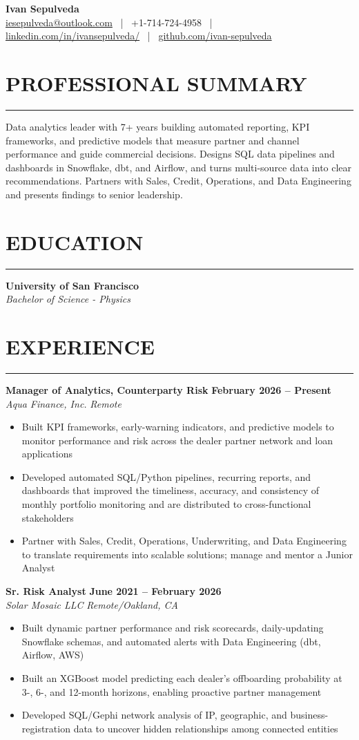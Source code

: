 \documentclass[10.5pt,letterpaper]{article}
\newcommand{\ressection}[1]{%
	\vspace{1.5mm}
	\section*{#1}
	\vspace{0.5mm}
	\hrule
	\vspace{1mm}
}
\newenvironment{myitemize}
{ \begin{itemize}[label={\textbullet}, leftmargin=*, topsep=1pt, partopsep=0pt, itemsep=1pt, parsep=0pt] }
	{ \end{itemize}                  }
\begin{document}
\begin{center}
	{\LARGE \textbf{Ivan Sepulveda}}\\[3pt]
	\href{mailto:iesepulveda@outlook.com}{iesepulveda@outlook.com} ~|~ +1-714-724-4958 ~|~ \href{https://www.linkedin.com/in/ivansepulveda/}{linkedin.com/in/ivansepulveda/} ~|~ \href{https://github.com/ivan-sepulveda}{github.com/ivan-sepulveda}
\end{center}

\ressection{PROFESSIONAL SUMMARY}
Data analytics leader with 7+ years building automated reporting, KPI frameworks, and predictive models that measure partner and channel performance and guide commercial decisions. Designs SQL data pipelines and dashboards in Snowflake, dbt, and Airflow, and turns multi-source data into clear recommendations. Partners with Sales, Credit, Operations, and Data Engineering and presents findings to senior leadership.

\ressection{EDUCATION}
\noindent\textbf{University of San Francisco} \\
\textit{Bachelor of Science - Physics}

\ressection{EXPERIENCE}

\noindent\textbf{Manager of Analytics, Counterparty Risk} \hfill \textbf{February 2026 -- Present} \\
\textit{Aqua Finance, Inc.} \hfill \textit{Remote}
\begin{myitemize}
	\item Built KPI frameworks, early-warning indicators, and predictive models to monitor performance and risk across the dealer partner network and loan applications
	\item Developed automated SQL/Python pipelines, recurring reports, and dashboards that improved the timeliness, accuracy, and consistency of monthly portfolio monitoring and are distributed to cross-functional stakeholders
	\item Partner with Sales, Credit, Operations, Underwriting, and Data Engineering to translate requirements into scalable solutions; manage and mentor a Junior Analyst
\end{myitemize}

\noindent\textbf{Sr. Risk Analyst} \hfill \textbf{June 2021 -- February 2026} \\
\textit{Solar Mosaic LLC} \hfill \textit{Remote/Oakland, CA}
\begin{myitemize}
	\item Built dynamic partner performance and risk scorecards, daily-updating Snowflake schemas, and automated alerts with Data Engineering (dbt, Airflow, AWS)
	\item Built an XGBoost model predicting each dealer's offboarding probability at 3-, 6-, and 12-month horizons, enabling proactive partner management
	\item Developed SQL/Gephi network analysis of IP, geographic, and business-registration data to uncover hidden relationships among connected entities
\end{myitemize}
\end{document}
